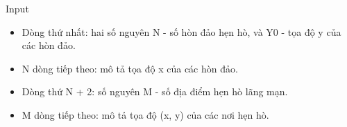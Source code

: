 Input  
\begin{itemize}
	\item     Dòng thứ nhất: hai số nguyên N - số hòn đảo hẹn hò, và Y0 - tọa độ y của các hòn đảo.   
	\item     N dòng tiếp theo: mô tả tọa độ x của các hòn đảo.   
	\item     Dòng thứ N + 2: số nguyên M - số địa điểm hẹn hò lãng mạn.   
	\item     M dòng tiếp theo: mô tả tọa độ (x, y) của các nơi hẹn hò.   
\end{itemize}